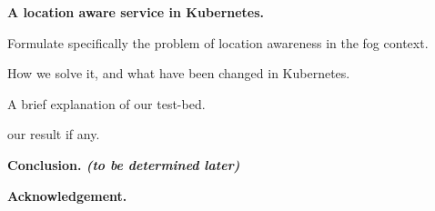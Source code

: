 \documentclass[9pt]{article}
\begin{document}
\begin{outline}
\begin{outline}
	\end{outline}
	
	\item {\bf  A location aware service in Kubernetes.}
	\begin{outline}
		\item Formulate specifically the problem of location awareness in the fog context.
		\item How we solve it, and what have been changed in Kubernetes. 
		\item A brief explanation of our test-bed.
		\item our result if any. 
				
	\end{outline}

	\item {\bf Conclusion. {\em (to be determined later)}}
	\item {\bf Acknowledgement.}



	

\end{outline}
\end{document}
